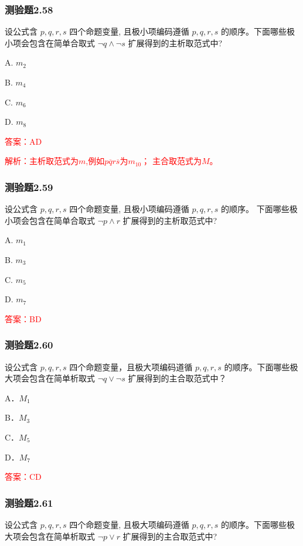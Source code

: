 \documentclass[UTF8, heading=true]{ctexart}
\begin{document}
\subsubsection{测验题2.58}

设公式含 $p, q, r, s$ 四个命题变量, 且极小项编码遵循 $p, q, r, s$ 的顺序。下面哪些极小项会包含在简单合取式 $\neg q \wedge \neg s$ 扩展得到的主析取范式中?

A. $ m_2$

B. $m_4$

C. $ m_6$

D. $ m_8$

\textcolor{red}{答案：AD}

\textcolor{red}{解析：主析取范式为$m$,例如$p \overline{q} r \overline{s}$为$m_{10}$；
主合取范式为$M$。}

\subsubsection{测验题2.59}

设公式含 $p, q, r, s$ 四个命题变量, 
且极小项编码遵循 $p, q, r, s$ 的顺序。
下面哪些极小项会包含在简单合取式 $\neg p \wedge r$ 
扩展得到的主析取范式中?

A. $ m_1$

B. $m_3$

C. $ m_5$

D. $ m_7$

\textcolor{red}{答案：BD}

\subsubsection{测验题2.60}

设公式含 $p, q, r, s$ 四个命题变量，且极大项编码道循 $p, q, r, s$ 的顺序。下面哪些极大项会包含在简单析取式 $\neg q \vee \neg s$ 扩展得到的主合取范式中？

A．$M_1$

B．$M_3$

C．$M_5$

D．$M_7$

\textcolor{red}{答案：CD}

\subsubsection{测验题2.61}

设公式含 $p, q, r, s$ 四个命题变量, 且极大项编码遵循 $p, q, r, s$ 的顺序。下面哪些极大项会包含在简单析取式 
$\neg p \vee r$ 扩展得到的主合取范式中?
\end{document}
